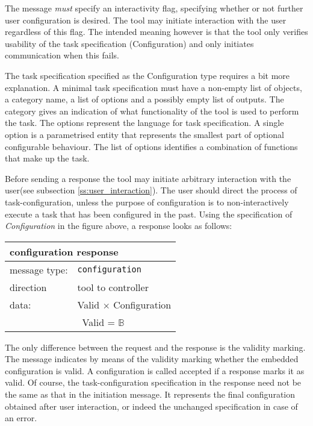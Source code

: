 \documentclass{article}
\newcommand{\msg}[1]{\texttt{#1}}
\begin{document}
   \noindent The message \emph{must} specify an interactivity flag, specifying
   whether or not further user configuration is desired. The tool may initiate
   interaction with the user regardless of this flag. The intended meaning
   however is that the tool only verifies usability of the task specification
   (Configuration) and only initiates communication when this fails.

   The task specification specified as the Configuration type requires a bit
   more explanation. A minimal task specification must have a non-empty list of
   objects, a category name, a list of options and a possibly empty list of
   outputs. The category gives an indication of what functionality of the tool
   is used to perform the task. The options represent the language for task
   specification. A single option is a parametrised entity that represents the
   smallest part of optional configurable behaviour. The list of options
   identifies a combination of functions that make up the task. 

   Before sending a response the tool may initiate arbitrary interaction with
   the user(see subsection \ref{ss:user_interaction}). The user should direct
   the process of task-configuration, unless the purpose of configuration is to
   non-interactively execute a task that has been configured in the past. Using
   the specification of \textit{Configuration} in the figure above, a response
   looks as follows:

   \begin{table}[H]
    \begin{center}
     \begin{tabular}{|ll|}
      \hline
       \multicolumn{2}{|l|}{\textbf{configuration response}} \\
      \hline
       message type:   & \msg{configuration} \\
      \hline
       direction       & tool to controller \\
       data:           & Valid $\times$ Configuration \\
                       & \ Valid = $\mathbb{B}$ \\
      \hline
     \end{tabular}
    \end{center}
    \vspace{-0.4cm}
   \end{table}

   \noindent The only difference between the request and the response is
   the validity marking. The message indicates by means of the validity marking
   whether the embedded configuration is valid. A configuration is called
   accepted if a response marks it as valid. Of course, the task-configuration
   specification in the response need not be the same as that in the initiation
   message. It represents the final configuration obtained after user
   interaction, or indeed the unchanged specification in case of an error.
\end{document}
